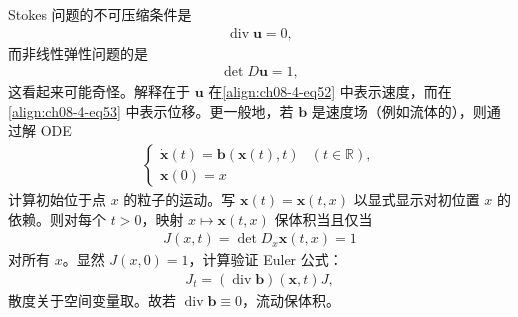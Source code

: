 \documentclass[../../main.tex]{subfiles}
\begin{document}
\begin{remark}[不可压缩性注记]\label{remark:ch08-4-2-不可压缩}
Stokes 问题的不可压缩条件是
\begin{align}
\operatorname{div}\mathbf{u}=0,\label{align:ch08-4-eq52}
\end{align}
而非线性弹性问题的是
\begin{align}
\det D\mathbf{u}=1,\label{align:ch08-4-eq53}
\end{align}
这看起来可能奇怪。解释在于 $\mathbf{u}$ 在\eqref{align:ch08-4-eq52} 中表示速度，而在\eqref{align:ch08-4-eq53} 中表示位移。更一般地，若 $\mathbf{b}$ 是速度场（例如流体的），则通过解 ODE
\begin{align*}
\begin{cases}
\dot{\mathbf{x}}(t)=\mathbf{b}(\mathbf{x}(t),t)&(t\in\mathbb{R}),\\
\mathbf{x}(0)=x
\end{cases}
\end{align*}
计算初始位于点 $x$ 的粒子的运动。写 $\mathbf{x}(t)=\mathbf{x}(t,x)$ 以显式显示对初位置 $x$ 的依赖。则对每个 $t>0$，映射 $x\mapsto\mathbf{x}(t,x)$ 保体积当且仅当
\begin{align*}
J(x,t)=\det D_x\mathbf{x}(t,x)=1
\end{align*}
对所有 $x$。显然 $J(x,0)=1$，计算验证 Euler 公式：
\begin{align*}
J_t=(\operatorname{div}\mathbf{b})(\mathbf{x},t)J,
\end{align*}
散度关于空间变量取。故若 $\operatorname{div}\mathbf{b}\equiv 0$，流动保体积。
\end{remark}
\end{document}
